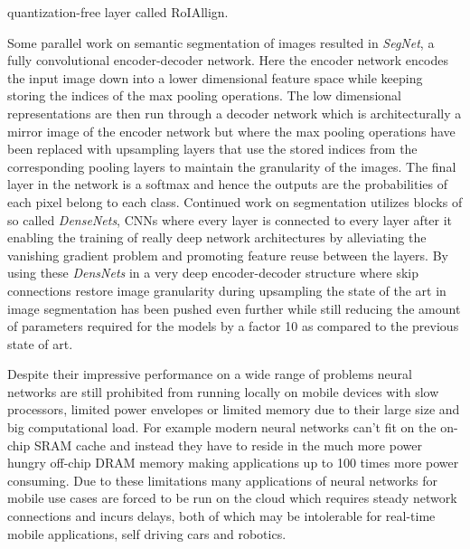 \documentclass[11pt]{article}
\newcommand{\bibentry}[1]{\cite{#1}}
\begin{document}
quantization-free layer called RoIAllign.

Some parallel work on semantic segmentation of images resulted in \emph{SegNet}\bibentry{badrinarayanan2015segnet}, a fully convolutional encoder-decoder network. Here the encoder network encodes the input image down into a lower dimensional feature space while keeping storing the indices of the max pooling operations. The low dimensional representations are then run through a decoder network which is architecturally a mirror image of the encoder network but where the max pooling operations have been replaced with upsampling layers that use the stored indices from the corresponding pooling layers to maintain the granularity of the images. The final layer in the network is a softmax and hence the outputs are the probabilities of each pixel belong to each class.
Continued work on segmentation utilizes blocks of so called \emph{DenseNets}\bibentry{huang2017densely}, CNNs where every layer is connected to every layer after it enabling the training of really deep network architectures by alleviating the vanishing gradient problem and promoting feature reuse between the layers. By using these \emph{DensNets} in a very deep encoder-decoder structure where skip connections restore image granularity during upsampling the state of the art in image segmentation has been pushed even further \bibentry{jegou2017one} while still reducing the amount of parameters required for the models by a factor 10 as compared to the previous state of art.

Despite their impressive performance on a wide range of problems neural networks are still prohibited from running locally on mobile devices with slow processors, limited power envelopes or limited memory due to their large size and big computational load. For example modern neural networks can't fit on the on-chip SRAM cache and instead they have to reside in the much more power hungry off-chip DRAM memory making applications up to 100 times more power consuming\bibentry{han2015learning}. Due to these limitations many applications of neural networks for mobile use cases are forced to be run on the cloud which requires steady network connections and incurs delays, both of which may be intolerable for real-time mobile applications, self driving cars and robotics.


 
\end{document}
